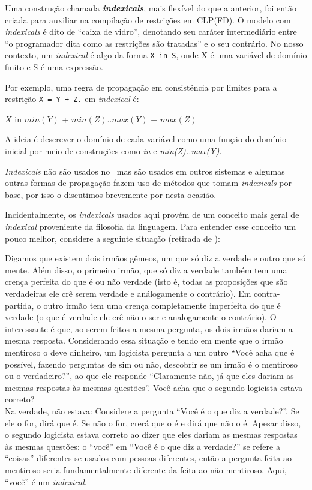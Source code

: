 \documentclass{article}
\begin{document}
Uma construção chamada \textbf{\textit{indexicals}}, mais flexível do que a anterior, foi então criada para auxiliar na compilação de
restrições em CLP(FD). O modelo com \textit{indexicals} é dito de ``caixa de vidro'', denotando seu caráter intermediário entre
``o programador dita como as restrições são tratadas'' e o seu contrário. No nosso contexto, um \textit{indexical} é algo da forma {\tt X in S}, onde X é uma variável de domínio finito e S é uma expressão.

Por exemplo, uma regra de propagação em consistência por limites para a restrição {\tt X = Y + Z.} em \textit{indexical} é:

    $X$ in $min(Y)$ + $min(Z)..max(Y)$ + $max(Z)$

A ideia é descrever o domínio de cada variável como uma função do domínio inicial por meio de construções como \textit{in} e \textit{min(Z)..max(Y)}.

\textit{Indexicals} não são usados no \eclipse\, mas são usados em outros sistemas e algumas outras formas de propagação fazem
uso de métodos que tomam \textit{indexicals} por base, por isso o discutimos brevemente por nesta ocasião.

Incidentalmente, os \textit{indexicals} usados aqui provém de um conceito mais geral de \textit{indexical} proveniente da filosofia da linguagem.
Para entender esse conceito um pouco melhor, considere a seguinte situação (retirada de \cite{raymond}):

Digamos que existem dois irmãos gêmeos, um que só diz a verdade e outro que só mente. Além disso, o primeiro irmão, que só diz a
verdade também tem uma crença perfeita do que é ou não verdade (isto é, todas as proposições que são verdadeiras ele crê serem
verdade e análogamente o contrário). Em contra-partida, o outro irmão tem uma crença completamente imperfeita do que é verdade
(o que é verdade ele crê não o ser e analogamente o contrário). O interessante é que, ao serem feitos a mesma pergunta,
os dois irmãos dariam a mesma resposta. Considerando essa situação e tendo em mente que o irmão mentiroso o deve dinheiro,
um logicista pergunta a um outro ``Você acha que é possível, fazendo perguntas de sim ou não, descobrir se um irmão é o mentiroso ou o verdadeiro?'', ao que ele responde ``Claramente não, já que eles dariam as mesmas respostas às mesmas questões''.
Você acha que o segundo logicista estava correto?\\
Na verdade, não estava: Considere a pergunta ``Você é o que diz a verdade?''. Se ele o for, dirá que é. Se não o for, crerá que
o é e dirá que não o é. Apesar disso, o segundo logicista estava correto ao dizer que eles dariam as mesmas respostas às mesmas questões: o ``você'' em ``Você é o que diz a verdade?'' se refere a ``coisas'' diferentes se usados com pessoas diferentes,
então a pergunta feita ao mentiroso seria fundamentalmente diferente da feita ao não mentiroso. Aqui, ``você'' é um \textit{indexical}.
\end{document}
